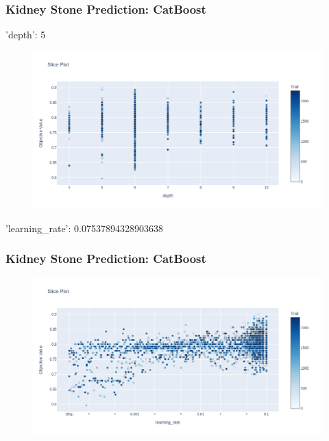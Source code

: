 \documentclass{beamer}
\begin{document}
\begin{frame}
\frametitle{Kidney Stone Prediction: CatBoost}
'depth': 5
\begin{figure}[H]
 \centering
 \includegraphics[scale=0.3]{opatuna_catboost_depth_kindey.png}
\end{figure}
\end{frame}

\begin{frame}
'learning\_rate': 0.07537894328903638
\frametitle{Kidney Stone Prediction: CatBoost}
\begin{figure}[H]
 \centering
 \includegraphics[scale=0.3]{optuna_learning_rate-catboost_kindey.png}
\end{figure}
\end{frame}


\end{document}
